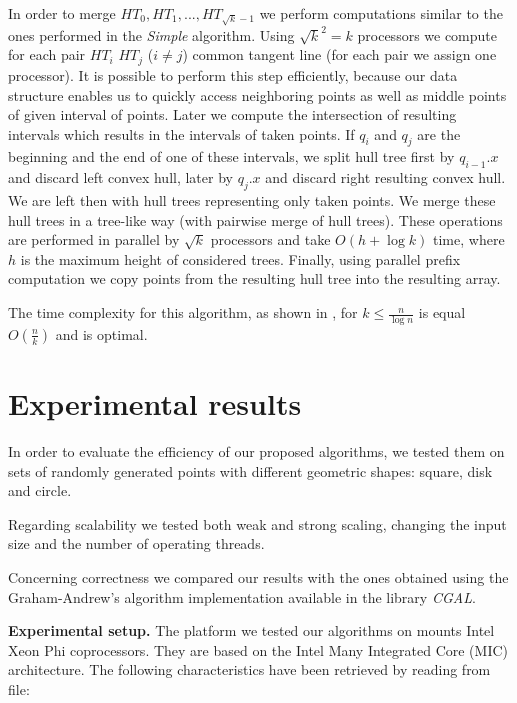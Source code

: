 \documentclass[letterpaper]{article}
\newcommand{\mypar}[1]{{\bf #1.}}
\theoremstyle{definition}
\begin{document}
In order to merge $HT_0, HT_1, ..., HT_{\sqrt{k} - 1}$ we perform computations similar to the ones performed in the \textit{Simple} algorithm.
Using $\sqrt{k}^2 = k$ processors we compute for each pair $HT_i$ $HT_j$ ($i \neq j$) common tangent line (for each pair we assign one processor).
It is possible to perform this step efficiently, because our data structure enables us to quickly access neighboring points as well as middle points of given interval of points.
Later we compute the intersection of resulting intervals which results in the intervals of taken points.
If $q_i$ and $q_j$ are the beginning and the end of one of these intervals, we split hull tree first by $q_{i-1}.x$ and discard left convex hull, later by $q_j.x$ and discard right resulting convex hull.
We are left then with hull trees representing only taken points.
We merge these hull trees in a tree-like way (with pairwise merge of hull trees).
These operations are performed in parallel by $\sqrt{k}$ processors and take $O(h + \log k)$ time, where $h$ is the maximum height of considered trees.
Finally, using parallel prefix computation we copy points from the resulting hull tree into the resulting array.

The time complexity for this algorithm, as shown in \cite{HullTree}, for $k \leq \frac{n}{\log n}$ is equal $O(\frac{n}{k})$ and is optimal.

\section{Experimental results}\label{sec:exp}

In order to evaluate the efficiency of our proposed algorithms, we tested them on sets of randomly generated points with different geometric shapes: square, disk and circle.

Regarding scalability we tested both weak and strong scaling, changing the input size and the number of operating threads.

Concerning correctness we compared our results with the ones obtained using the Graham-Andrew's algorithm implementation available in the library \textit{CGAL}\cite{CGAL}.

\mypar{Experimental setup}
The platform we tested our algorithms on mounts Intel Xeon Phi coprocessors.
They are based on the Intel Many Integrated Core (MIC) architecture.
The following characteristics have been retrieved by reading from  file:
\end{document}
